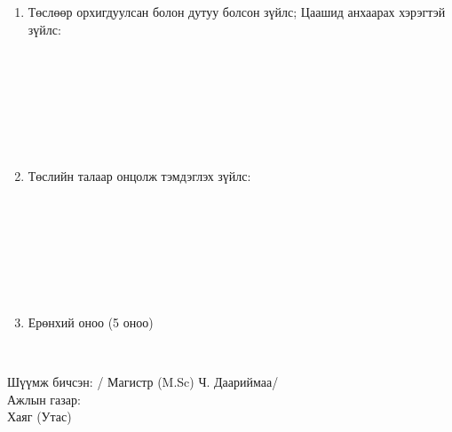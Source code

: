 \begin{titlepage}
\begin{enumerate}
\item Төслөөр орхигдуулсан болон дутуу болсон зүйлс; Цаашид анхаарах хэрэгтэй зүйлс:
\begin{center}
\dotfill \\[0.1cm]
\dotfill \\[0.1cm]
\dotfill \\[0.1cm]
\dotfill \\[0.1cm]
\dotfill \\[0.1cm]
\dotfill \\[0.4cm]
\end{center}

\item Төслийн талаар онцолж тэмдэглэх зүйлс:
\begin{center}
\dotfill \\[0.1cm]
\dotfill \\[0.1cm]
\dotfill \\[0.1cm]
\dotfill \\[0.1cm]
\dotfill \\[0.1cm]
\dotfill \\[0.4cm]
\end{center}

\item Ерөнхий оноо (5 оноо)
\begin{center}
\dotfill \\[1cm]
\end{center}
\end{enumerate}

Шүүмж бичсэн: \makebox[3cm]{\dotfill} / Магистр (M.Sc) Ч. Даариймаа/ \\[0.5cm]
Ажлын газар: \dotfill \\[0.5cm]
Хаяг (Утас) \makebox[5cm]{\dotfill}
\end{titlepage}
